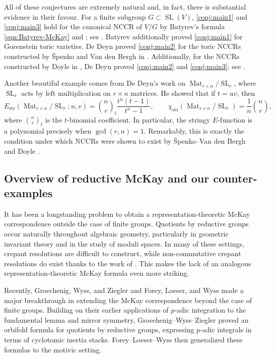 \documentclass[12pt,a4paper]{amsart}
\theoremstyle{definition}
\newcommand{\str}{\mathrm{str}}
\renewcommand{\1}{\textbf{1}}
\newcommand{\<}{\langle}
\renewcommand{\>}{\rangle}
\DeclareMathOperator{\Mat}{Mat}
\DeclareMathOperator{\SL}{SL}
\begin{document}
All of these conjectures are extremely natural and, in fact, there is substantial evidence in their favour. For a finite subgroup $G\subset\SL(V)$, \autoref{conj:main1} and \autoref{conj:main3} hold for the canonical NCCR of $V/G$ by Batyrev's formula \eqref{eqn:Batyrev-McKay} and \cite{Batyrev99}; see \cite[Examples 5.4 and 5.16]{vanDenBerghICM}. Batyrev \cite{Batyrev2000} additionally proved \autoref{conj:main1} for Gorenstein toric varieties. De Deyn proved \autoref{conj:main2} for the toric NCCRs constructed by \v{S}penko and Van den Bergh in \cite{SpenkoVanDenBergh2020i,SpenkoVanDenBergh2020ii}. Additionally, for the NCCRs constructed by Doyle in \cite{DeDeyn2023}, De Deyn proved \autoref{conj:main2} and \autoref{conj:main3}; see \cite[Example 5.17]{vanDenBerghICM}.

Another beautiful example comes from De Deyn's work \cite{DeDeyn2023} on $\Mat_{r\times n}/\SL_r$, where $\SL_r$ acts by left multiplication on $r\times n$ matrices. He showed that if $t=uv$, then
\[
	E_{\str}(\Mat_{r\times n}/\SL_r;u,v)={n\choose r}_{\! t}\frac{t^n(t-1)}{t^n-1},\qquad\chi_{\str}(\Mat_{r\times n}/\SL_r)=\frac{1}{n}{n\choose r},
\]
where ${n\choose r}_t$ is the $t$-binomial coefficient. In particular, the stringy $E$-function is a polynomial precisely when $\gcd(r,n)=1$. Remarkably, this is exactly the condition under which NCCRs were shown to exist by \v{S}penko--Van den Bergh \cite[Theorem 1.4.5]{SpenkoVanDenBergh17} and Doyle \cite[Theorem 1.1]{Doyle21}.





\subsection{Overview of reductive McKay and our counter-examples}
It has been a longstanding problem to obtain a representation-theoretic McKay correspondence outside the case of finite groups. Quotients by reductive groups occur naturally throughout algebraic geometry, particularly in geometric invariant theory and in the study of moduli spaces. In many of these settings, crepant resolutions are difficult to construct, while non-commutative crepant resolutions do exist thanks to the work of \cite{SpenkoVanDenBergh17}. This makes the lack of an analogous representation-theoretic McKay formula even more striking.

Recently, Groechenig, Wyss, and Ziegler \cite{GWZ} and Forey, Loeser, and Wyss \cite{FLW} made a major breakthrough in extending the McKay correspondence beyond the case of finite groups. Building on their earlier applications of $p$-adic integration to the fundamental lemma and mirror symmetry, Groechenig--Wyss--Ziegler proved an orbifold formula for quotients by reductive groups, expressing $p$-adic integrals in terms of cyclotomic inertia stacks. Forey--Loeser--Wyss then generalized these formulas to the motivic setting. 
\end{document}

